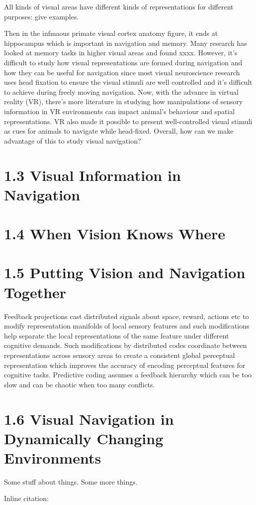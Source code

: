 All kinds of visual areas have different kinds of representations for different purposes: give examples.

Then in the infmaous primate visual cortex anatomy figure, it ends at hippocampus which is important in navigation and memory. Many research has looked at memory tasks in higher visual areas and found xxxx.
However, it's difficult to study how visual representations are formed during navigation and how they can be useful for navigation since most visual neuroscience research uses head fixation to ensure the visual stimuli are well controlled and it's difficult to achieve during freely moving navigation. Now, with the advance in virtual reality (VR), there's more literature in studying how manipulations of sensory information in VR environments can impact animal's behaviour and spatial representations. VR also made it possible to present well-controlled visual stimuli as cues for animals to navigate while head-fixed. Overall, how can we make advantage of this to study visual navigation?

\section{1.3 Visual Information in Navigation}


\section{1.4 When Vision Knows Where}


\section{1.5 Putting Vision and Navigation Together}

Feedback projections cast distributed signals about space, reward, actions etc to modify representation manifolds of local sensory features and such modifications help separate the local representations of the same feature under different cognitive demands. Such modifications by distributed codes coordinate between representations across sensory areas to create a consistent global perceptual representation which improves the accuracy of encoding perceptual features for cognitive tasks. Predictive coding assumes a feedback hierarchy which can be too slow and can be chaotic when too many conflicts.
\section{1.6 Visual Navigation in Dynamically Changing Environments}

Some stuff about things.\cite{example-citation} Some more things. 

Inline citation: 

\blindtext
